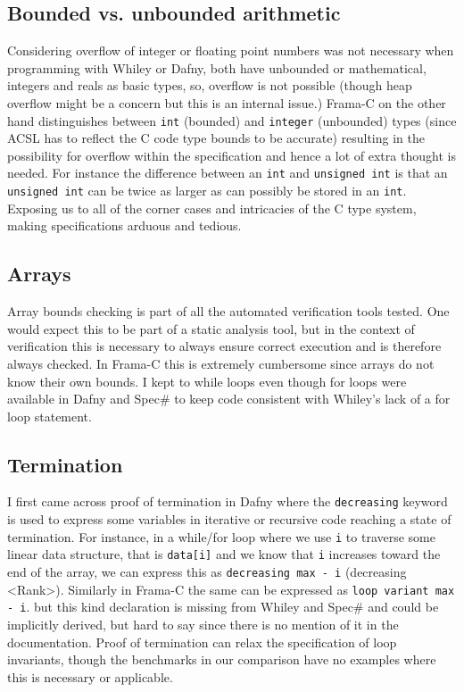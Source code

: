 \documentclass[10pt]{article} %
\begin{document}
\subsection{Bounded vs. unbounded arithmetic}
Considering overflow of integer or floating point numbers was not necessary when programming with Whiley or Dafny, both have unbounded or mathematical, integers and reals as basic types, so, overflow is not possible (though heap overflow might be a concern but this is an internal issue.) Frama-C on the other hand distinguishes between \verb/int/ (bounded) and \verb/integer/ (unbounded) types (since ACSL has to reflect the C code type bounds to be accurate) resulting in the possibility for overflow within the specification and hence a lot of extra thought is needed. For instance the difference between an \verb/int/ and \verb/unsigned int/ is that an \verb/unsigned int/ can be twice as larger as can possibly be stored in an \verb/int/. Exposing us to all of the corner cases and intricacies of the C type system, making specifications arduous and tedious.

\subsection{Arrays}
Array bounds checking is part of all the automated verification tools tested. One would expect this to be part of a static analysis tool, but in the context of verification this is necessary to always ensure correct execution and is therefore always checked. In Frama-C this is extremely cumbersome since arrays do not know their own bounds. I kept to while loops even though for loops were available in Dafny and Spec\# to keep code consistent with Whiley's lack of a for loop statement.

\subsection{Termination}
I first came across proof of termination in Dafny where the \verb/decreasing/ keyword is used to express some variables in iterative or recursive code reaching a state of termination. For instance, in a while/for loop where we use \verb/i/ to traverse some linear data structure, that is \verb/data[i]/ and we know that \verb/i/ increases toward the end of the array, we can express this as \verb/decreasing max - i/ (decreasing <Rank>). Similarly in Frama-C the same can be expressed as \verb/loop variant max - i/. but this kind declaration is missing from Whiley and Spec\# and could be implicitly derived, but hard to say since there is no mention of it in the documentation. Proof of termination can relax the specification of loop invariants, though the benchmarks in our comparison have no examples where this is necessary or applicable.
\end{document}
